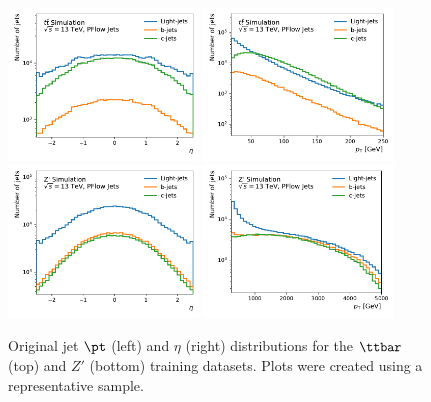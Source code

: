 \begin{figure}
    \centering
    \includegraphics[width=0.45\textwidth]{figures/flavour_tagging/ttbar_0.pdf}
    \includegraphics[width=0.45\textwidth]{figures/flavour_tagging/ttbar_1.pdf}
    \includegraphics[width=0.45\textwidth]{figures/flavour_tagging/zprime_0.pdf}
    \includegraphics[width=0.45\textwidth]{figures/flavour_tagging/zprime_1.pdf}
    \caption{Original jet $\pt$ (left) and $\eta$ (right) distributions for the $\ttbar$ (top) and $Z'$ (bottom) training datasets. Plots were created using a representative sample.}
    \label{fig:jet_pt_eta}
\end{figure}

